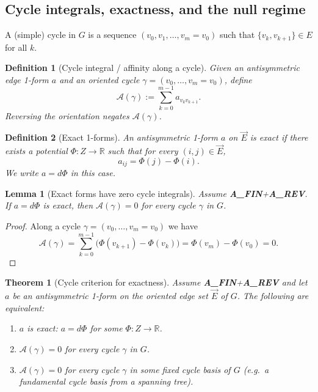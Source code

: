 \documentclass[11pt]{article}
\newtheorem{definition}{Definition}
\newtheorem{lemma}{Lemma}
\newtheorem{theorem}{Theorem}
\theoremstyle{remark}
\begin{document}
\subsection{Cycle integrals, exactness, and the null regime}

A (simple) cycle in $G$ is a sequence $(v_0,v_1,\dots,v_m=v_0)$ such that $\{v_k,v_{k+1}\}\in E$
for all $k$.

\begin{definition}[Cycle integral / affinity along a cycle]
\label{def:cycle-integral}
Given an antisymmetric edge 1-form $a$ and an oriented cycle $\gamma=(v_0,\dots,v_m=v_0)$, define
\[
\mathcal A(\gamma) := \sum_{k=0}^{m-1} a_{v_k v_{k+1}}.
\]
Reversing the orientation negates $\mathcal A(\gamma)$.
\end{definition}

\begin{definition}[Exact 1-forms]
\label{def:exact-one-form}
An antisymmetric 1-form $a$ on $\vec E$ is \emph{exact} if there exists a potential
$\Phi:Z\to\mathbb R$ such that for every $(i,j)\in \vec E$,
\[
a_{ij} = \Phi(j)-\Phi(i).
\]
We write $a=d\Phi$ in this case.
\end{definition}

\begin{lemma}[Exact forms have zero cycle integrals]
\label{lem:exact-zero-cycles}
Assume \textbf{A\_FIN}+\textbf{A\_REV}.
If $a=d\Phi$ is exact, then $\mathcal A(\gamma)=0$ for every cycle $\gamma$ in $G$.
\end{lemma}

\begin{proof}
Along a cycle $\gamma=(v_0,\dots,v_m=v_0)$ we have
\[
\mathcal A(\gamma)=\sum_{k=0}^{m-1}\big(\Phi(v_{k+1})-\Phi(v_k)\big)=\Phi(v_m)-\Phi(v_0)=0.
\]
\end{proof}

\begin{theorem}[Cycle criterion for exactness]
\label{thm:cycle-criterion-exact}
Assume \textbf{A\_FIN}+\textbf{A\_REV} and let $a$ be an antisymmetric 1-form on the oriented edge
set $\vec E$ of $G$. The following are equivalent:
\begin{enumerate}
\item $a$ is exact: $a=d\Phi$ for some $\Phi:Z\to\mathbb R$.
\item $\mathcal A(\gamma)=0$ for every cycle $\gamma$ in $G$.
\item $\mathcal A(\gamma)=0$ for every cycle $\gamma$ in some fixed cycle basis of $G$
(e.g.\ a fundamental cycle basis from a spanning tree).
\end{enumerate}
\end{theorem}
\end{document}
